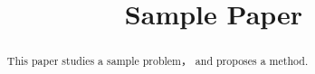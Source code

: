 \documentclass{article}
\begin{document}
\title{Sample Paper}
\maketitle
\begin{abstract}
This paper studies a sample problem， and proposes a method.
\end{abstract}


\end{document}
